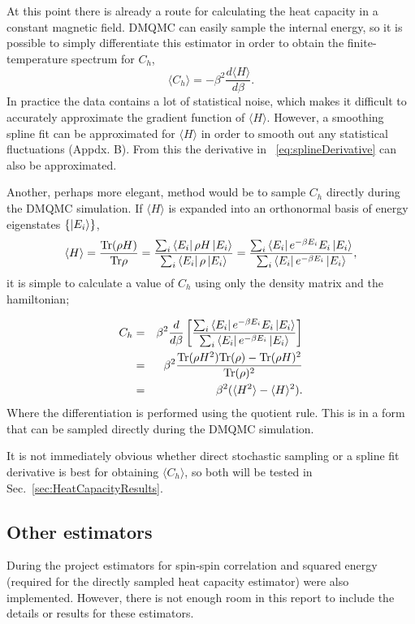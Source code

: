 At this point there is already a route for calculating the heat capacity in a constant magnetic field. DMQMC can easily sample the internal energy, so it is possible to simply differentiate this estimator in order to obtain the finite-temperature spectrum for $C_h$,
\begin{equation}
\langle C_{h} \rangle = -\beta^2\frac{d\langle H \rangle}{d\beta}.
\label{eq:splineDerivative}
\end{equation}
In practice the data contains a lot of statistical noise, which makes it difficult to accurately approximate the gradient function of $\langle H\rangle$. However, a smoothing spline fit can be approximated for $\langle H \rangle$ in order to smooth out any statistical fluctuations (Appdx. B). From this the derivative in ~\ref{eq:splineDerivative} can also be approximated.

Another, perhaps more elegant, method would be to sample $C_h$ directly during the DMQMC simulation. 
If $\langle H \rangle$ is expanded into an orthonormal basis of energy eigenstates $\{\ket{E_i}\}$,
\begin{equation}
\langle H \rangle = \frac{\mbox{Tr}(\rho H)}{\mbox{Tr}\rho} = \frac{\sum_{i}\bra{E_i}\rho H\ket{E_i}}{\sum_{i}\bra{E_i}\rho\ket{E_i}}
= \frac{\sum_{i}\bra{E_i}e^{-\beta E_i}E_i\ket{E_i}}{\sum_{i}\bra{E_i}e^{-\beta E_i}\ket{E_i}}
,
\end{equation}
it is simple to calculate a value of $C_h$ using only the density matrix and the hamiltonian;

\begin{eqnarray}
C_h &=&  \beta^2\frac{d}{d\beta}\left[ \frac{\sum_{i}\bra{E_i}e^{-\beta E_i}E_i\ket{E_i}}{\sum_{i}\bra{E_i}e^{-\beta E_i}\ket{E_i}} \right]\nonumber\\ 
&=& \beta^2\frac{\mbox{Tr}(\rho H^2)\mbox{Tr}(\rho)-\mbox{Tr}(\rho H)^2}{\mbox{Tr}(\rho)^2}\nonumber\\
&=& \beta^2(\langle H^2\rangle - \langle H \rangle^2).
\label{eq:heatCapacityEstimator}
\end{eqnarray}
Where the differentiation is performed using the quotient rule. This is in a form that can be sampled directly during the DMQMC simulation.

It is not immediately obvious whether direct stochastic sampling or a spline fit derivative is best for obtaining $\langle C_h \rangle$, so both will be tested in Sec.~\ref{sec:HeatCapacityResults}.

\subsection{Other estimators}
During the project estimators for spin-spin correlation and squared energy (required for the directly sampled heat capacity estimator) were also implemented. However, there is not enough room in this report to include the details or results for these estimators.

